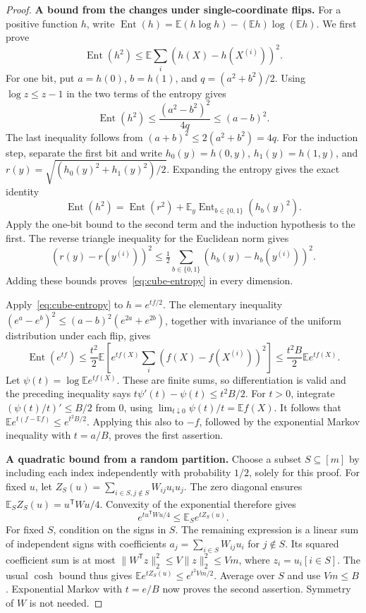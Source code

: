 \documentclass[11pt,a4paper]{article}
\theoremstyle{definition}
\theoremstyle{remark}
\newcommand{\E}{\mathbb E}
\newcommand{\bits}{\{0,1\}}
\begin{document}
\begin{proof}
\par\medskip\noindent\textbf{A bound from the changes under single-coordinate flips.}
For a positive function $h$, write
$\operatorname{Ent}(h)=\E(h\log h)-(\E h)\log(\E h)$.
We first prove
\begin{equation}
 \operatorname{Ent}(h^2)
 \le\E\sum_i(h(X)-h(X^{(i)}))^2.             \label{eq:cube-entropy}
\end{equation}
For one bit, put $a=h(0)$, $b=h(1)$, and $q=(a^2+b^2)/2$.
Using $\log z\le z-1$ in the two terms of the entropy gives
\[
 \operatorname{Ent}(h^2)
 \le\frac{(a^2-b^2)^2}{4q}\le(a-b)^2.
\]
The last inequality follows from $(a+b)^2\le2(a^2+b^2)=4q$.
For the induction step, separate the first bit and write
$h_0(y)=h(0,y)$, $h_1(y)=h(1,y)$, and
$r(y)=\sqrt{(h_0(y)^2+h_1(y)^2)/2}$.
Expanding the entropy gives the exact identity
\[
 \operatorname{Ent}(h^2)
 =\operatorname{Ent}(r^2)+
   \E_y\operatorname{Ent}_{b\in\bits}(h_b(y)^2).
\]
Apply the one-bit bound to the second term and the induction hypothesis
to the first. The reverse triangle inequality for the Euclidean norm gives
\[
 (r(y)-r(y^{(i)}))^2\le
 \tfrac12\sum_{b\in\bits}(h_b(y)-h_b(y^{(i)}))^2.
\]
Adding these bounds proves~\eqref{eq:cube-entropy} in every dimension.

Apply~\eqref{eq:cube-entropy} to $h=e^{tf/2}$. The elementary inequality
$(e^a-e^b)^2\le(a-b)^2(e^{2a}+e^{2b})$, together with invariance of the
uniform distribution under each flip, gives
\[
 \operatorname{Ent}(e^{tf})
 \le\frac{t^2}{2}\E\left[e^{tf(X)}
             \sum_i(f(X)-f(X^{(i)}))^2\right]
 \le\frac{t^2B}{2}\E e^{tf(X)}.
\]
Let $\psi(t)=\log\E e^{tf(X)}$. These are finite sums, so differentiation
is valid and the preceding inequality says
$t\psi'(t)-\psi(t)\le t^2B/2$.
For $t>0$, integrate $(\psi(t)/t)'\le B/2$ from $0$, using
$\lim_{t\downarrow0}\psi(t)/t=\E f(X)$. It follows that
$\E e^{t(f-\E f)}\le e^{t^2B/2}$.
Applying this also to $-f$, followed by the exponential Markov inequality
with $t=a/B$, proves the first assertion.

\par\medskip\noindent\textbf{A quadratic bound from a random partition.}
Choose a subset $S\subseteq[m]$ by including each index independently
with probability $1/2$, solely for this proof. For fixed $u$, let
$Z_S(u)=\sum_{i\in S,j\notin S}W_{ij}u_i u_j$.
The zero diagonal ensures
$\E_S Z_S(u)=u^{\mathsf T}Wu/4$. Convexity of the exponential therefore gives
\[
 e^{t u^{\mathsf T}Wu/4}\le\E_S e^{tZ_S(u)}.
\]
For fixed $S$, condition on the signs in $S$. The remaining expression
is a linear sum of independent signs with coefficients
$a_j=\sum_{i\in S}W_{ij}u_i$ for $j\notin S$.
Its squared coefficient sum is at most
$\|W^{\mathsf T}z\|_2^2\le V\|z\|_2^2\le Vm$, where
$z_i=u_i[i\in S]$. The usual $\cosh$ bound thus gives
$\E e^{tZ_S(u)}\le e^{t^2Vm/2}$.
Average over $S$ and use $Vm\le B$. Exponential Markov with $t=e/B$
now proves the second assertion. Symmetry of $W$ is not needed.
\end{proof}
\end{document}

